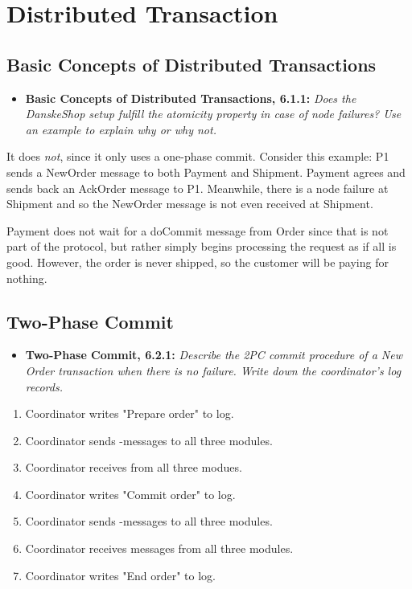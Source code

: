 \newpage
\section{Distributed Transaction}

\subsection{Basic Concepts of Distributed Transactions}


\begin{itemize}
  \item \textbf{Basic Concepts of Distributed Transactions, 6.1.1:}
        \textit{Does the DanskeShop setup fulfill the atomicity property in case
        of node failures? Use an example to explain why or why not.}
\end{itemize}

It does \emph{not}, since it only uses a one-phase commit. Consider this
example: P1 sends a NewOrder message to both Payment and Shipment. Payment
agrees and sends back an AckOrder message to P1. Meanwhile, there is a node
failure at Shipment and so the NewOrder message is not even received at
Shipment.
\medskip

Payment does not wait for a doCommit message from Order since that is not part
of the protocol, but rather simply begins processing the request as if all is
good. However, the order is never shipped, so the customer will be paying for
nothing.

\sectend

\subsection{Two-Phase Commit}

\begin{itemize}
  \item \textbf{Two-Phase Commit, 6.2.1:}
        \textit{Describe the 2PC commit procedure of a New Order transaction
        when there is no failure. Write down the coordinator's log records.}
\end{itemize}

\begin{enumerate}
  \item Coordinator writes "Prepare order" to log.
  \item Coordinator sends -messages to all three modules.
  \item Coordinator receives  from all three modues.
  \item Coordinator writes "Commit order" to log.
  \item Coordinator sends -messages to all three modules.
  \item Coordinator receives  messages from all three modules.
  \item Coordinator writes "End order" to log.
\end{enumerate}


